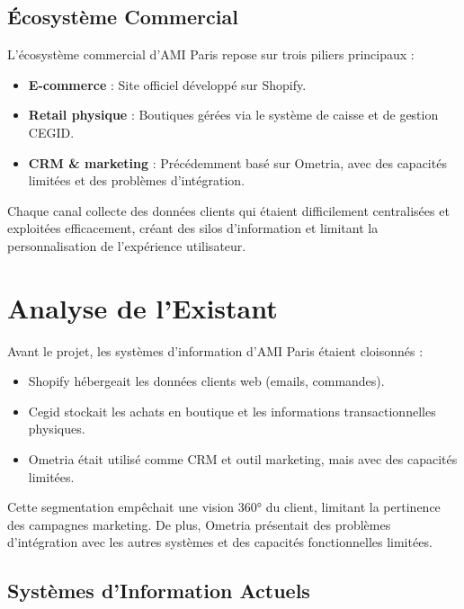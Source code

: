 \subsection{Écosystème Commercial}

L'écosystème commercial d'AMI Paris repose sur trois piliers principaux :
\begin{itemize}
    \item \textbf{E-commerce} : Site officiel développé sur Shopify.
    \item \textbf{Retail physique} : Boutiques gérées via le système de caisse et de gestion CEGID.
    \item \textbf{CRM \& marketing} : Précédemment basé sur Ometria, avec des capacités limitées et des problèmes d'intégration.
\end{itemize}

Chaque canal collecte des données clients qui étaient difficilement centralisées et exploitées efficacement, créant des silos d'information et limitant la personnalisation de l'expérience utilisateur.

\newpage
\section{Analyse de l'Existant}

Avant le projet, les systèmes d'information d'AMI Paris étaient cloisonnés :
\begin{itemize}
    \item Shopify hébergeait les données clients web (emails, commandes).
    \item Cegid stockait les achats en boutique et les informations transactionnelles physiques.
    \item Ometria était utilisé comme CRM et outil marketing, mais avec des capacités limitées.
\end{itemize}

\begin{mdframed}[backgroundcolor=warningorange, linewidth=0pt, innerleftmargin=10pt, innerrightmargin=10pt]
Cette segmentation empêchait une vision 360° du client, limitant la pertinence des campagnes marketing. De plus, Ometria présentait des problèmes d'intégration avec les autres systèmes et des capacités fonctionnelles limitées.
\end{mdframed}

\subsection{Systèmes d'Information Actuels}

